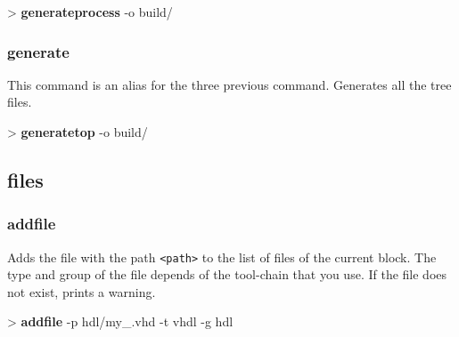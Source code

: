 \documentclass[10pt,a4paper]{article}
\begin{document}
\begin{sampletitle}
> \textbf{\tool{} generateprocess} -o build/
\end{sampletitle}

\subsubsection{generate}

This command is an alias for the three previous command. Generates all the tree files.\\


\begin{sampletitle}
> \textbf{\tool{} generatetop} -o build/
\end{sampletitle}


\subsection{files}
\subsubsection{addfile}
\label{subsec:addfile}

Adds the file with the path \texttt{<path>} to the list of files of the current \kind{} block. The type and group of the file depends of the tool-chain that you use. If the file does not exist, prints a warning.\\


\begin{sampletitle}
> \textbf{\tool{} addfile} -p hdl/my\_\kind{}.vhd -t vhdl -g hdl
\end{sampletitle}
\end{document}
